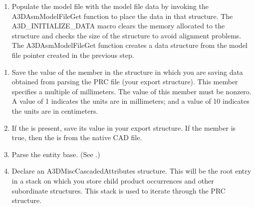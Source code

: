 \documentclass[letterpaper,12pt,english,openany,oneside]{sphinxmanual}
\begin{document}
\begin{sphinxVerbatim}[commandchars=\\\{\}]
   
     
\end{sphinxVerbatim}
\begin{enumerate}
%
\setcounter{enumi}{1}
\item {} 
Populate the model file with the model file data by invoking the A3DAsmModelFileGet function to place the data in that structure. The A3D\_INITIALIZE\_DATA macro clears the memory allocated to the structure and checks the size of the structure to avoid alignment problems. The A3DAsmModelFileGet function creates a data structure from the model file pointer created in the previous step.

\end{enumerate}

\begin{sphinxVerbatim}[commandchars=\\\{\}]
 


    
\end{sphinxVerbatim}
\begin{enumerate}
%
\setcounter{enumi}{2}
\item {} 
Save the value of the  member in the structure in which you are saving data obtained from parsing the PRC file (your export structure). This member specifies a multiple of millimeters. The value of this member must be non\sphinxhyphen{}zero. A value of 1 indicates the units are in millimeters; and a value of 10 indicates the units are in centimeters.

\item {} 
If the  is present, save its value in your export structure. If the  member is true, then the  is from the native CAD file.

\item {} 
Parse the entity base. (See .)

\item {} 
Declare an A3DMiscCascadedAttributes structure. This will be the root entry in a stack on which you store child product occurrences and other subordinate structures. This stack is used to iterate through the PRC structure.

\end{enumerate}
\end{document}
